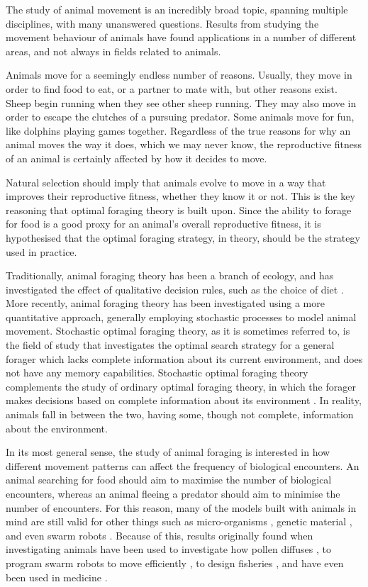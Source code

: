 
The study of animal movement is an incredibly broad topic, spanning multiple disciplines, with many unanswered questions. Results from studying the movement behaviour of animals have found applications in a number of different areas, and not always in fields related to animals.

Animals move for a seemingly endless number of reasons. Usually, they move in order to find food to eat, or a partner to mate with, but other reasons exist. Sheep begin running when they see other sheep running. They may also move in order to escape the clutches of a pursuing predator. 
Some animals move for fun, like dolphins playing games together.
Regardless of the true reasons for why an animal moves the way it does, which we may never know, the reproductive fitness of an animal is certainly affected by how it decides to move.

Natural selection should imply that animals evolve to move in a way that improves their reproductive fitness, whether they know it or not. 
This is the key reasoning that optimal foraging theory is built upon. 
Since the ability to forage for food is a good proxy for an animal's overall reproductive fitness, it is hypothesised that the optimal foraging strategy, in theory, should be the strategy used in practice.

Traditionally, animal foraging theory has been a branch of ecology, and has investigated the effect of qualitative decision rules, such as the choice of diet \cite{Raubenheimer_2018}. 
More recently, animal foraging theory has been investigated using a more quantitative approach, generally employing stochastic processes to model animal movement.  Stochastic optimal foraging theory, as it is sometimes referred to, is the field of study that investigates the optimal search strategy for a general forager which lacks complete information about its current environment, and does not have any memory capabilities. Stochastic optimal foraging theory complements the study of ordinary optimal foraging theory, in which the forager makes decisions based on complete information about its environment \cite{Bartumeus_2013}. In reality, animals fall in between the two, having some, though not complete, information about the environment.

In its most general sense, the study of animal foraging is interested in how different movement patterns can affect the frequency of biological encounters. An animal searching for food should aim to maximise the number of biological encounters, whereas an animal fleeing a predator should aim to minimise the number of encounters. For this reason, many of the models built with animals in mind are still valid for other things such as micro-organisms \cite{Benichou_2007}, genetic material \cite{Hoyle_2007}, and even swarm robots \cite{Sahin_2005}. Because of this, results originally found when investigating animals have been used to investigate how pollen diffuses \cite{Shaw_2006}, to program swarm robots to move efficiently \cite{Sahin_2005}, to design fisheries \cite{Richard_2018}, and have even been used in medicine \cite{Codling_2008}.

